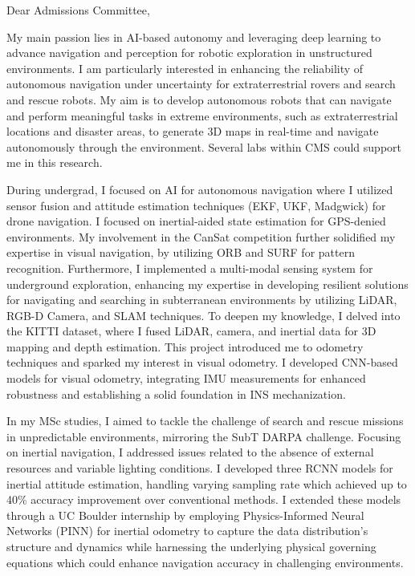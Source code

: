 \documentclass[a4,20pt]{article}
\begin{document}
\begin{large} 
Dear Admissions Committee,

My main passion lies in AI-based autonomy and leveraging deep learning to advance navigation and perception for robotic exploration in unstructured environments. I am particularly interested in enhancing the reliability of autonomous navigation under uncertainty for extraterrestrial rovers and search and rescue robots. My aim is to develop autonomous robots that can navigate and perform meaningful tasks in extreme environments, such as extraterrestrial locations and disaster areas, to generate 3D maps in real-time and navigate autonomously through the environment. Several labs within CMS could support me in this research.


During undergrad, I focused on AI for autonomous navigation where I utilized sensor fusion and attitude estimation techniques (EKF, UKF, Madgwick) for drone navigation. I focused on inertial-aided state estimation for GPS-denied environments. My involvement in the CanSat competition further solidified my expertise in visual navigation, by utilizing ORB and SURF for pattern recognition. Furthermore, I implemented a multi-modal sensing system for underground exploration, enhancing my expertise in developing resilient solutions for navigating and searching in subterranean environments by utilizing LiDAR, RGB-D Camera, and SLAM techniques. To deepen my knowledge, I delved into the KITTI dataset, where I fused LiDAR, camera, and inertial data for 3D mapping and depth estimation. This project introduced me to odometry techniques and sparked my interest in visual odometry. I developed CNN-based models for visual odometry, integrating IMU measurements for enhanced robustness and establishing a solid foundation in INS mechanization.

In my MSc studies, I aimed to tackle the challenge of search and rescue missions in unpredictable environments, mirroring the SubT DARPA challenge. Focusing on inertial navigation, I addressed issues related to the absence of external resources and variable lighting conditions. I developed three RCNN models for inertial attitude estimation, handling varying sampling rate which achieved up to 40\% accuracy improvement over conventional methods. I extended these models through a UC Boulder internship by employing Physics-Informed Neural Networks (PINN) for inertial odometry to capture the data distribution's structure and dynamics while harnessing the underlying physical governing equations which could enhance navigation accuracy in challenging environments.


\end{large}
\end{document}
